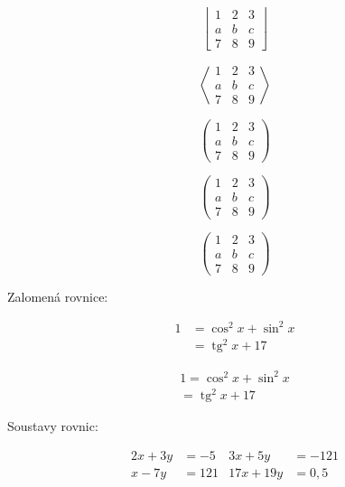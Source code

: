 \documentclass[a4paper, 12pt]{article}
\DeclareMathOperator{\tg}{tg}
\begin{document}
$$
    \left \lfloor
    \begin{matrix}
        1 & 2 & 3 \\
        a & b & c \\
        7 & 8 & 9
    \end{matrix}
    \right \rfloor
$$

$$
    \left \langle
    \begin{matrix}
        1 & 2 & 3 \\
        a & b & c \\
        7 & 8 & 9
    \end{matrix}
    \right \rangle
$$

$$
    \left(
    \begin{array}{cc|c} %
            1 & 2 & 3 \\
            a & b & c \\
            \hline
            7 & 8 & 9
        \end{array}
    \right)
$$

$$
    \left(
    \begin{matrix}
            1 & 2 & 3 \\
            a & b & c \\
            7 & 8 & 9
        \end{matrix}
    \right)
$$

$$
    \left(
    \begin{smallmatrix}
            1 & 2 & 3\\
            a & b & c\\
            7 & 8 & 9
        \end{smallmatrix}
    \right)
$$

Zalomená rovnice:

\begin{equation}
    \begin{split}
        1 &=  \cos ^ 2 x + \sin ^2 x \\
        & =  \tg ^2 x + 17
    \end{split}
\end{equation}

\begin{multline}
    1 =  \cos ^ 2 x + \sin ^2 x \\
    =  \tg ^2 x + 17
\end{multline}

Soustavy rovnic:

\begin{align} \label{TriSoust}
    2x + 3y & = -5  & 3x + 5y   & = -121  \\
    x - 7y  & = 121 & 17x + 19y & = 0{,}5
\end{align}
\end{document}
